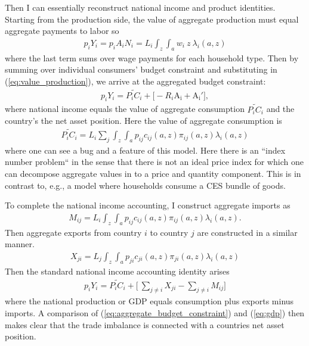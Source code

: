 \documentclass[12pt,pdftex]{article}
\begin{document}
\begin{onehalfspacing}
Then I can essentially reconstruct national income and product identities. Starting from the production side, the value of aggregate production must equal aggregate payments to labor so
\begin{align}
p_{i} Y_{i} = p_{i} A_{i} N_{i} = L_i \int_{z} \int_{a} w_{i} \ z \ \lambda_i(a, z)
\label{eq:value_production}
\end{align}
where the last term sums over wage payments for each household type. Then by summing over individual consumers' budget constraint and substituting in (\ref{eq:value_production}), we arrive at the aggregated budget constraint:
\begin{align}
p_{i} Y_{i}  = \widetilde{P_{i} C_i}  + \bigg[-R_i\mathrm{A_i} +  \mathrm{A_i'} \bigg],
\label{eq:aggregate_budget_constraint}
\end{align}
where national income equals the value of aggregate consumption $\widetilde{P_{i} C_i}$ and the country's the net asset position. Here the value of aggregate consumption is
\begin{align}
\widetilde{P_{i} C_i} = L_{i} \sum_{j} \int_{z} \int_{a}  p_{ij} c_{ij}(a, z) \pi_{ij}(a, z) \lambda_i(a, z)
\end{align}
where one can see a bug and a feature of this model. Here there is an ``index number problem`` in the sense that there is not an ideal price index for which one can decompose aggregate values in to a price and quantity component. This is in contrast to, e.g., a model where households consume a CES bundle of goods.

To complete the national income accounting, I construct aggregate imports as
\begin{align}
M_{ij} = L_i \int_{z} \int_{a}  p_{ij} c_{ij}(a, z) \pi_{ij}(a, z) \lambda_i(a, z).
\label{eq:imports}
\end{align}
Then aggregate exports from country $i$ to country $j$ are constructed in a similar manner.
\begin{align}
X_{ji} = L_j \int_{z} \int_{a}  p_{ji} c_{ji}(a, z) \pi_{ji}(a, z) \lambda_i(a, z)
\label{eq:exports}
\end{align}
Then the standard national income accounting identity arises
\begin{align}
p_{i} Y_{i}  = \widetilde{P_{i} C_i} + \bigg[\ \sum_{j\neq i}X_{ji} -  \sum_{j\neq i}M_{ij} \bigg]
\label{eq:gdp}
\end{align}
where the national production or GDP equals consumption plus exports minus imports. A comparison of (\ref{eq:aggregate_budget_constraint}) and (\ref{eq:gdp}) then makes clear that the trade imbalance is connected with a countries net asset position.


\end{onehalfspacing}
\end{document}
